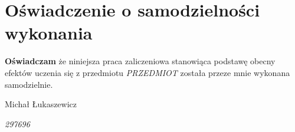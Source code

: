 \documentclass[12pt, a4paper, headings=normal]{article}
\newcommand{\className}{PRZEDMIOT}
\begin{document}

\newpage

\tableofcontents

\section{Oświadczenie o samodzielności wykonania}

\textbf{Oświadczam} że niniejsza praca zaliczeniowa stanowiąca podstawę obecny
efektów uczenia się z przedmiotu \textit{\className} została przeze
mnie wykonana samodzielnie.

\bigskip
\hfill Michał Łukaszewicz

\hfill \textit{297696}
\end{document}
